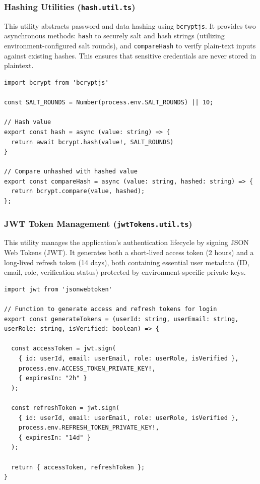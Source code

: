 \subsubsection{Hashing Utilities (\texttt{hash.util.ts})}
This utility abstracts password and data hashing using \texttt{bcryptjs}. It provides two asynchronous methods: \texttt{hash} to securely salt and hash strings (utilizing environment-configured salt rounds), and \texttt{compareHash} to verify plain-text inputs against existing hashes. This ensures that sensitive credentials are never stored in plaintext.

\begin{lstlisting}[caption={Hashing and Comparison Utility}]
import bcrypt from 'bcryptjs'

const SALT_ROUNDS = Number(process.env.SALT_ROUNDS) || 10;

// Hash value
export const hash = async (value: string) => {
  return await bcrypt.hash(value!, SALT_ROUNDS)
}

// Compare unhashed with hashed value
export const compareHash = async (value: string, hashed: string) => {
  return bcrypt.compare(value, hashed);
};
\end{lstlisting}

\subsubsection{JWT Token Management (\texttt{jwtTokens.util.ts})}
This utility manages the application's authentication lifecycle by signing JSON Web Tokens (JWT). It generates both a short-lived access token (2 hours) and a long-lived refresh token (14 days), both containing essential user metadata (ID, email, role, verification status) protected by environment-specific private keys.

\begin{lstlisting}[caption={Token Generation Utility}]
import jwt from 'jsonwebtoken'

// Function to generate access and refresh tokens for login
export const generateTokens = (userId: string, userEmail: string, userRole: string, isVerified: boolean) => {

  const accessToken = jwt.sign(
    { id: userId, email: userEmail, role: userRole, isVerified },
    process.env.ACCESS_TOKEN_PRIVATE_KEY!,
    { expiresIn: "2h" }
  );

  const refreshToken = jwt.sign(
    { id: userId, email: userEmail, role: userRole, isVerified },
    process.env.REFRESH_TOKEN_PRIVATE_KEY!,
    { expiresIn: "14d" }
  );

  return { accessToken, refreshToken };
}
\end{lstlisting}

